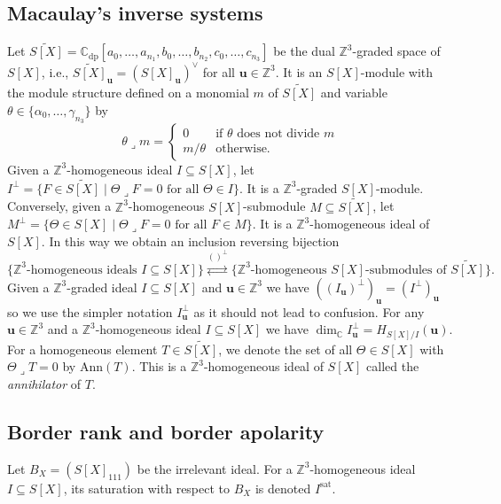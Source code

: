 \documentclass[12pt]{amsart}
\theoremstyle{definition}
\theoremstyle{remark}
\theoremstyle{definition}
\newcommand{\sat}{\mathrm{sat}}
\newcommand{\HF}[2]{H_{#1}(#2)}
\newcommand{\CC}{\mathbb{C}}
\newcommand{\Ann}{\mathrm{Ann}}
\begin{document}
\subsection{Macaulay's inverse systems}
Let $\widetilde{S[X]} = \CC_{\mathrm{dp}}[a_{0}, \ldots, a_{n_1}, b_{0},\ldots, b_{n_2}, c_0, \ldots,c_{n_3}]$
be the dual $\mathbb{Z}^3$-graded space of $S[X]$, i.e., $\widetilde{S[X]}_\mathbf{u} = (S[X]_\mathbf{u})^\vee$ for all $\mathbf{u}\in \mathbb{Z}^3$. 
It is an $S[X]$-module with the module structure defined on a monomial $m$ of $\widetilde{S[X]}$ and variable $\theta\in \{\alpha_0,\ldots, \gamma_{n_3}\}$ by 
\[
\theta \lrcorner m = \begin{cases}
 0 & \textrm{if } \theta\textrm{ does not divide } m\\
 m/\theta & \textrm{otherwise.}
\end{cases}
\]
Given a $\mathbb{Z}^3$-homogeneous ideal $I\subseteq S[X]$, let $I^\perp = \{F\in \widetilde{S[X]} \mid \Theta \lrcorner F = 0 \text{ for all } \Theta\in I\}$. It is a $\mathbb{Z}^3$-graded $S[X]$-module. Conversely, given a $\mathbb{Z}^3$-homogeneous $S[X]$-submodule $M\subseteq \widetilde{S[X]}$, let $M^\perp = \{\Theta\in S[X] \mid \Theta\lrcorner F = 0 \text{ for all } F\in M\}$. It is a $\mathbb{Z}^3$-homogeneous ideal of $S[X]$.
In this way we obtain an inclusion reversing bijection 
\[
\big\{\mathbb{Z}^3\textrm{-homogeneous ideals }I\subseteq S[X]\big\} \overset{()^\perp}{\rightleftarrows} \big\{\mathbb{Z}^3\textrm{-homogeneous }S[X]\textrm{-submodules of }\widetilde{S[X]}\big\}.
\]
Given a $\mathbb{Z}^3$-graded ideal $I\subseteq S[X]$ and $\mathbf{u}\in \mathbb{Z}^3$ we have $((I_{\mathbf{u}})^\perp)_\mathbf{u} = (I^\perp)_{\mathbf{u}}$ so we use the simpler notation $I_\mathbf{u}^\perp$ as it should not lead to confusion. For any $\mathbf{u}\in \mathbb{Z}^3$ and a $\mathbb{Z}^3$-homogeneous ideal $I\subseteq S[X]$ we have $\dim_\CC I^\perp_\mathbf{u}  = \HF{S[X]/I}{\mathbf{u}}$.
For a homogeneous element $T\in \widetilde{S[X]}$, we denote the set of all $\Theta\in S[X]$ with $\Theta\lrcorner T = 0$ by $\Ann(T)$. This is a $\mathbb{Z}^3$-homogeneous ideal of $S[X]$ called the \emph{annihilator} of $T$.
\subsection{Border rank and border apolarity}

Let $B_X = (S[X]_{111})$ be the irrelevant ideal. For a $\mathbb{Z}^3$-homogeneous ideal $I\subseteq S[X]$, its saturation with respect to $B_X$ is denoted $I^\sat$.
\end{document}
